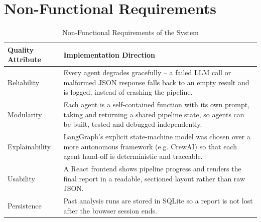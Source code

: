 

\pagestyle{fancy}
\setcounter{page}{4}

\setcounter{chapter}{2}\setcounter{section}{1}\setcounter{table}{1}
\section{Non-Functional Requirements}
\begin{table}[H]
\centering
\caption{Non-Functional Requirements of the System}
\label{tab:nonfunctional}
\begin{tabularx}{\textwidth}{|>{\raggedright\arraybackslash}p{3.6cm}|X|}
\hline
\textbf{Quality Attribute} & \textbf{Implementation Direction} \\
\hline
Reliability & Every agent degrades gracefully -- a failed LLM call or malformed JSON response falls back to an empty result and is logged, instead of crashing the pipeline. \\
\hline
Modularity & Each agent is a self-contained function with its own prompt, taking and returning a shared pipeline state, so agents can be built, tested and debugged independently. \\
\hline
Explainability & LangGraph's explicit state-machine model was chosen over a more autonomous framework (e.g. CrewAI) so that each agent hand-off is deterministic and traceable. \\
\hline
Usability & A React frontend shows pipeline progress and renders the final report in a readable, sectioned layout rather than raw JSON. \\
\hline
Persistence & Past analysis runs are stored in SQLite so a report is not lost after the browser session ends. \\
\hline
\end{tabularx}
\end{table}

